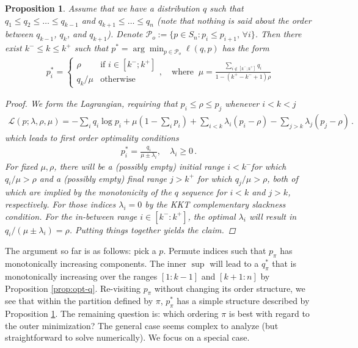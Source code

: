 \documentclass{article}
\newtheorem{proposition}{Proposition}
\begin{document}
\begin{proposition}
\label{prop:opt-p}
Assume that we have a distribution $q$ such that $q_1 \le q_2 \le \dots \le q_{k-1}$ and $q_{k+1} \le \dots \le q_n$ (note that nothing is said about the order between $q_{k-1}$, $q_k$, and $q_{k+1}$). Denote $\mathcal P_{o} := \{ p \in S_n: p_{i} \le p_{i+1}, \, \forall i\}$. Then there exist $k^- \le k \le k^+$ such that $p^* = \arg\min_{p \in \mathcal P_o} \ell(q,p)$ has the form 
\begin{align}
p^*_i = \begin{cases}
	\rho & \text{if $i \in [k^-; k^+]$} \\
	q_k/\mu & \text{otherwise}
\end{cases}, \quad \text{where}\;\; 
\mu = \frac{\sum_{i \not\in [k^-; k^+]} q_i}{1 - (k^+-k^-+1)\rho}
\end{align}
\begin{proof}
We form the Lagrangian, requiring that $p_i \le \rho \le p_j$ whenever $i<k<j$
\begin{align}
\nonumber \mathcal L(p;\lambda,\rho,\mu) = 
 	- \sum_i q_i \log p_i
	+ \mu \left( 1 - \sum_i p_i \right) 
	+ \sum_{i<k} \lambda_i (p_i - \rho) - \sum_{j>k} \lambda_j (p_j - \rho) \,.
\end{align}
which leads to first order optimality conditions
\begin{align*}
p_i^* = \frac{q_i}{\mu \pm \lambda_i}, \quad \lambda_i \ge 0 \,.
\end{align*}
For fixed $\mu, \rho$, there will be a (possibly empty) initial range $i < k^-$for which $q_i/\mu >\rho$ and a (possibly empty) final range $j > k^+$ for which $q_j/\mu > \rho$, both of which are implied by the monotonicity of the $q$ sequence for $i<k$ and $j>k$, respectively. For those indices $\lambda_i=0$ by the KKT complementary slackness condition.  For the in-between range $i \in [k^-:k^+]$, the optimal $\lambda_i$ will result in $q_i/(\mu  \pm \lambda_i) = \rho$. Putting things together yields the claim.
\end{proof}
\end{proposition}
The argument so far is as follows: pick a $p$. Permute indices such that $p_{\pi}$ has monotonically increasing components. The inner $\sup$ will lead to a $q_\pi^*$ that is monotonically increasing over the ranges $[1:k-1]$ and $[k+1:n]$ by Proposition \ref{prop:opt-q}. Re-visiting $p_\pi$ without changing its order structure, we see that within the partition defined by $\pi$, $p^*_\pi$ has a simple structure described by Proposition \ref{prop:opt-p}. The remaining question is: which ordering $\pi$ is best with regard to the outer minimization? The general case seems complex to analyze (but straightforward to solve numerically). We focus on a special case. 
\end{document}
